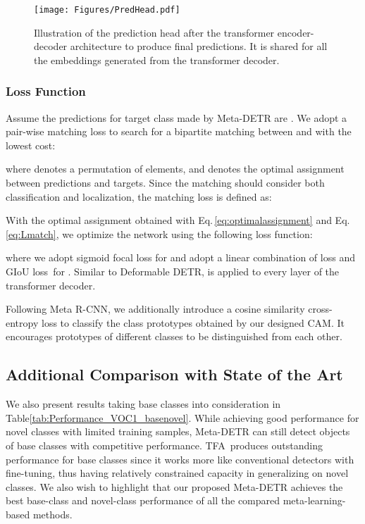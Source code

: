 \documentclass[letterpaper]{article} \usepackage{aaai22}  \usepackage{times}  \usepackage{helvet}  \usepackage{courier}  \usepackage[hyphens]{url}  \usepackage{graphicx} \urlstyle{rm} \def\UrlFont{\rm}  \usepackage{natbib}  \usepackage{caption} \DeclareCaptionStyle{ruled}{labelfont=normalfont,labelsep=colon,strut=off} \frenchspacing  \setlength{\pdfpagewidth}{8.5in}  \setlength{\pdfpageheight}{11in}  \usepackage{algorithm}
\begin{document}
\begin{figure}[t] 
\begin{center}
   \texttt{[image: Figures/PredHead.pdf]}
\end{center}
\vspace*{-3.0mm}
   \caption{Illustration of the prediction head after the transformer encoder-decoder architecture to produce final predictions. It is shared for all the embeddings generated from the transformer decoder.}
\label{fig:pred_head}
\vspace*{-1.0mm}
\end{figure}


\subsubsection{Loss Function}
Assume the  predictions for target class made by Meta-DETR are . We adopt a pair-wise matching loss  to search for a bipartite matching between  and  with the lowest cost:

where  denotes a permutation of  elements, and  denotes the optimal assignment between predictions and targets. Since the matching should consider both classification and localization, the matching loss is defined as:


With the optimal assignment  obtained with Eq.\,\ref{eq:optimalassignment} and Eq.\,\ref{eq:Lmatch}, we optimize the network using the following loss function:

where we adopt sigmoid focal loss\;\cite{focalloss} for  and adopt a linear combination of  loss and GIoU loss\,\cite{giouloss} for . Similar to Deformable DETR\;\cite{DeformableDETR},  is applied to every layer of the transformer decoder.


Following Meta R-CNN\;\cite{metarcnn}, we additionally introduce a cosine similarity cross-entropy loss\;\cite{CloserFewshotClassification} to classify the class prototypes obtained by our designed CAM. It encourages prototypes of different classes to be distinguished from each other.



\subsection{Additional Comparison with State of the Art}

We also present results taking base classes into consideration in Table\;\ref{tab:Performance_VOC1_basenovel}. While achieving good performance for novel classes with limited training samples, Meta-DETR can still detect objects of base classes with competitive performance. TFA\,\cite{fsdet} produces outstanding performance for base classes since it works more like conventional detectors with fine-tuning, thus having relatively constrained capacity in generalizing on novel classes. We also wish to highlight that our proposed Meta-DETR achieves the best base-class and novel-class performance of all the compared meta-learning-based methods.
\end{document}
